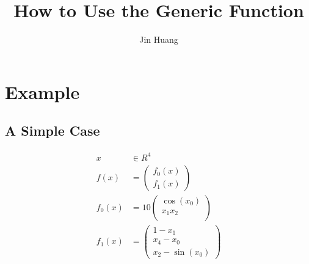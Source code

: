 \documentclass{article}
\title{How to Use the Generic Function}
\author{Jin Huang}
\begin{document}
\maketitle

\section{Example}

\subsection{A Simple Case}
\begin{equation}
  \begin{split}
    x&\in R^4\\
    f(x) &=
    \begin{pmatrix}
      f_0(x)\\
      f_1(x)
    \end{pmatrix}\\
    f_0(x) &= 10
    \begin{pmatrix}
      \cos(x_0)\\
      x_1x_2\\
    \end{pmatrix}\\
    f_1(x) &=
    \begin{pmatrix}
      1-x_1\\
      x_4-x_0\\
      x_2-\sin(x_0)
    \end{pmatrix}
  \end{split}
\end{equation}
\end{document}

